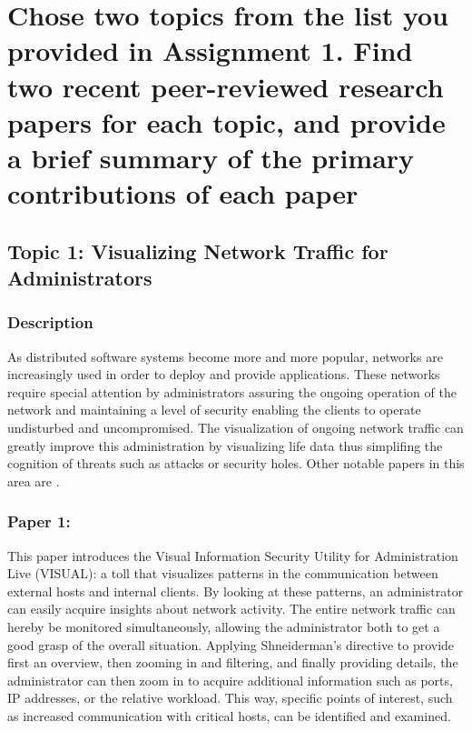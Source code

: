 \section{Chose two topics from the list you provided in Assignment 1. Find two recent peer-reviewed research papers for each topic, and provide a brief summary of the primary contributions of each paper}

\subsection{Topic 1: Visualizing Network Traffic for Administrators}
\subsubsection{Description}
As distributed software systems become more and more popular, networks are increasingly used in order to deploy and provide applications. These networks require special attention by administrators assuring the ongoing operation of the network and maintaining a level of security enabling the clients to operate undisturbed and uncompromised. The visualization of ongoing network traffic can greatly improve this administration by visualizing life data thus simplifing the cognition of threats such as attacks or security holes. Other notable papers in this area are \cite{network:other:keim, network:other:iliofotou, network:other:komlodi, network:other:lemal, network:other:becker, network:other:becker2, network:other:yoshida, network:other:oline}.

\subsubsection{Paper 1: \cite{network:ball}}
This paper introduces the Visual Information Security Utility for Administration Live (VISUAL): a toll that visualizes patterns in the communication between external hosts and internal clients. By looking at these patterns, an administrator can easily acquire insights about network activity. The entire network traffic can hereby be monitored simultaneously, allowing the administrator both to get a good grasp of the overall situation. Applying Shneiderman's directive \cite{visualization:shneiderman} to provide first an overview, then zooming in and filtering, and finally providing details, the administrator can then zoom in to acquire additional information such as ports, IP addresses, or the relative workload. This way, specific points of interest, such as increased communication with critical hosts, can be identified and examined.

